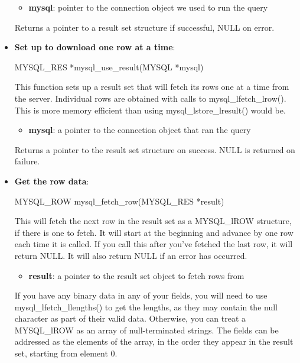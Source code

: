 \documentclass{report}
\begin{document}
\begin{itemize}
            \begin{itemize}
                \item \textbf{mysql}: pointer to the connection object we used to run the query
            \end{itemize}
            \bigbreak \noindent 
            Returns a pointer to a result set structure if successful, NULL on error.
        \item \textbf{Set up to download one row at a time}:
            \bigbreak \noindent 
            \begin{cppcode}
            MYSQL_RES *mysql_use_result(MYSQL *mysql)
            \end{cppcode}
            \bigbreak \noindent 
            This function sets up a result set that will fetch its rows one at a time from the server. Individual rows are obtained with calls to mysql\_lfetch\_lrow(). This is more memory efficient than using mysql\_lstore\_lresult() would be.
            \begin{itemize}
                \item \textbf{mysql}: a pointer to the connection object that ran the query
            \end{itemize}
            \bigbreak \noindent 
            Returns a pointer to the result set structure on success. NULL is returned on failure.
        \item \textbf{Get the row data}:
            \bigbreak \noindent 
            \begin{cppcode}
            MYSQL_ROW mysql_fetch_row(MYSQL_RES *result)
            \end{cppcode}
            \bigbreak \noindent 
            This will fetch the next row in the result set as a MYSQL\_lROW structure, if there is one to fetch. It will start at the beginning and advance by one row each time it is called. If you call this after you've fetched the last row, it will return NULL. It will also return NULL if an error has occurred.
            \bigbreak \noindent 
            \begin{itemize}
                \item \textbf{result}: a pointer to the result set object to fetch rows from
            \end{itemize}
            \bigbreak \noindent 
            If you have any binary data in any of your fields, you will need to use mysql\_lfetch\_llengths() to get the lengths, as they may contain the null character as part of their valid data. Otherwise, you can treat a MYSQL\_lROW as an array of null-terminated strings. The fields can be addressed as the elements of the array, in the order they appear in the result set, starting from element 0.

\end{itemize}
\end{document}
